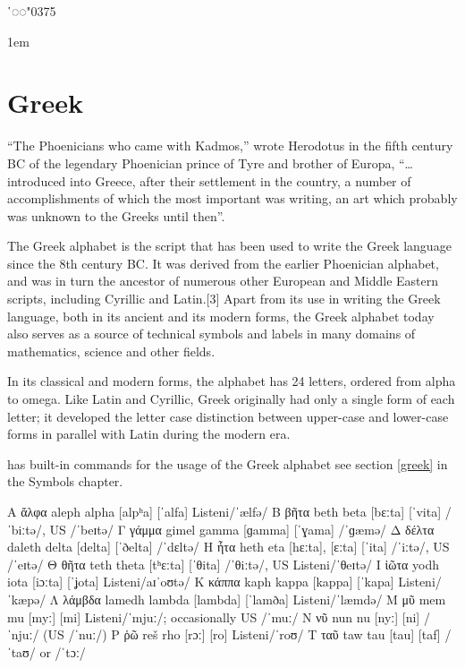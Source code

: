 \def\diacritic#1{{#1\LARGE ῾◌◌\char"0375}}
\newfontfamily{}
\def\greektext#1{\greek{#1}}
\diacritic{\greek}

\parindent1em

\chapter{Greek}

``The Phoenicians who came with Kadmos,'' wrote Herodotus in the fifth century BC of the legendary Phoenician prince of Tyre and brother of Europa, ``\ldots introduced into Greece, after their settlement in the country, a number of accomplishments of which the most important was writing, an art which probably was unknown to the Greeks until then''. 

The Greek alphabet is the script that has been used to write the Greek language since the 8th century BC. It was derived from the earlier Phoenician alphabet, and was in turn the ancestor of numerous other European and Middle Eastern scripts, including Cyrillic and Latin.[3] Apart from its use in writing the Greek language, both in its ancient and its modern forms, the Greek alphabet today also serves as a source of technical symbols and labels in many domains of mathematics, science and other fields.

In its classical and modern forms, the alphabet has 24 letters, ordered from alpha to omega. Like Latin and Cyrillic, Greek originally had only a single form of each letter; it developed the letter case distinction between upper-case and lower-case forms in parallel with Latin during the modern era.

\tex has built-in commands for the usage of the Greek alphabet see section \ref{greek} in the Symbols chapter.

\bgroup
\obeylines
\greek\obeyspaces

Α	ἄλφα	aleph	alpha	[alpʰa]	[ˈalfa]	Listeni/ˈælfə/
Β	βῆτα	beth	beta	[bɛːta]	[ˈvita]	/ˈbiːtə/, US /ˈbeɪtə/
Γ	γάμμα	gimel	gamma	[ɡamma]	[ˈɣama]	/ˈɡæmə/
Δ	δέλτα	daleth	delta	[delta]	[ˈðelta]	/ˈdɛltə/
Η	ἦτα	  heth	   eta	 [hɛːta], [ɛːta]	[ˈita]	/ˈiːtə/, US /ˈeɪtə/
Θ	θῆτα	teth	theta	[tʰɛːta]	[ˈθita]	/ˈθiːtə/, US Listeni/ˈθeɪtə/
Ι	ἰῶτα	yodh	iota	[iɔːta]	[ˈʝota]	Listeni/aɪˈoʊtə/
Κ	κάππα	kaph	kappa	[kappa]	[ˈkapa]	Listeni/ˈkæpə/
Λ	λάμβδα	lamedh	lambda	[lambda]	[ˈlamða]	Listeni/ˈlæmdə/
Μ	μῦ	mem	mu	[myː]	[mi]	Listeni/ˈmjuː/; occasionally US /ˈmuː/
Ν	νῦ	nun	nu	[nyː]	[ni]	/ˈnjuː/ (US /ˈnuː/)
Ρ	ῥῶ	reš	rho	[rɔː]	[ro]	Listeni/ˈroʊ/
Τ	ταῦ	taw	tau	[tau]	[taf]	/ˈtaʊ/ or /ˈtɔː/
\egroup


